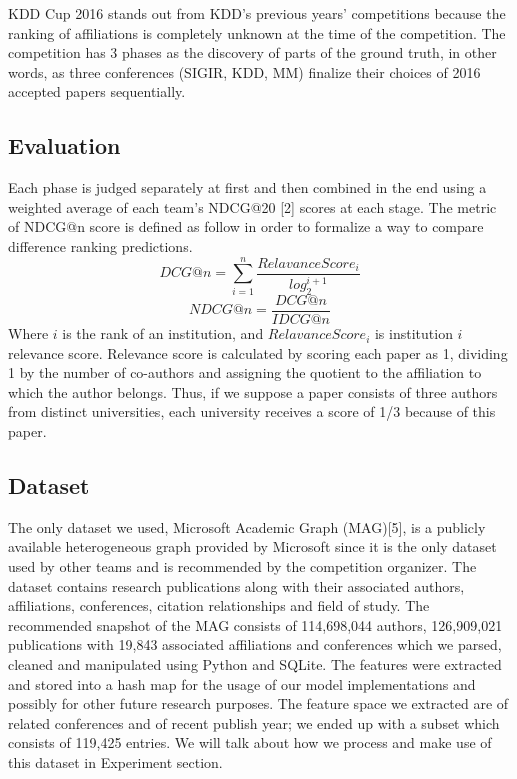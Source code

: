 \documentclass[letterpaper]{article}
\begin{document}
KDD Cup 2016 stands out from KDD's previous years' competitions because the ranking of affiliations is completely unknown at the time of the competition. The competition has 3 phases as the discovery of parts of the ground truth, in other words, as three conferences (SIGIR, KDD, MM) finalize their choices of 2016 accepted papers sequentially. 



\subsection{Evaluation}

Each phase is judged separately at first and then combined in the end using a weighted average of each team's NDCG@20 [2] scores at each stage. The metric of NDCG@n score is defined as follow in order to formalize a way to compare difference ranking predictions.
\begin{equation}
DCG@n = \sum_{i=1}^{n} \frac{RelavanceScore_i}{log_{2}^{i+1}}
\end{equation}
\begin{equation}
NDCG@n = \frac{DCG@n}{IDCG@n}
\end{equation}
Where $i$ is the rank of an institution, and $RelavanceScore_i$ is institution $i$ relevance score. Relevance score is calculated by scoring each paper as 1, dividing 1 by the number of co-authors and assigning the quotient to the affiliation to which the author belongs. Thus, if we suppose a paper consists of three authors from distinct universities, each university receives a score of 1/3 because of this paper.

\subsection{Dataset}
The only dataset we used, Microsoft Academic Graph (MAG)[5], is a publicly available heterogeneous graph provided by Microsoft since it is the only dataset used by other teams and is recommended by the competition organizer. The dataset contains research publications along with their associated authors, affiliations, conferences, citation relationships and field of study. The recommended snapshot of the MAG consists of 114,698,044 authors, 126,909,021 publications with 19,843 associated affiliations and conferences which we parsed, cleaned and manipulated using Python and SQLite. The features were extracted and stored into a hash map for the usage of our model implementations and possibly for other future research purposes. The feature space we extracted are of related conferences and of recent publish year; we ended up with a subset which consists of 119,425 entries. We will talk about how we process and make use of this dataset in Experiment section.\\
\end{document}
